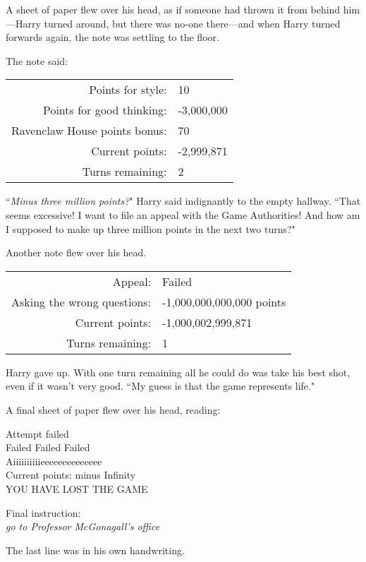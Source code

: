 A sheet of paper flew over his head, as if someone had thrown it from behind him—Harry turned around, but there was no-one there—and when Harry turned forwards again, the note was settling to the floor.

The note said:
\begin{writtenNote}
\begin{tabular}{rl}
Points for style: & 10\\
Points for good thinking: & -3,000,000\\
Ravenclaw House points bonus: & 70\\
Current points: & -2,999,871\\
Turns remaining: & 2
\end{tabular}
\end{writtenNote}

``\emph{Minus three million points?}" Harry said indignantly to the empty hallway. ``That seems excessive! I want to file an appeal with the Game Authorities! And how am I supposed to make up three million points in the next two turns?"

Another note flew over his head.
\begin{writtenNote}
\begin{tabular}{rl}
Appeal: & Failed\\
Asking the wrong questions: & -1,000,000,000,000 points\\
Current points: & -1,000,002,999,871\\
Turns remaining: & 1
\end{tabular}
\end{writtenNote}

Harry gave up. With one turn remaining all he could do was take his best shot, even if it wasn't very good. ``My guess is that the game represents life."

A final sheet of paper flew over his head, reading:

\begin{writtenNote}
Attempt failed\\
Failed Failed Failed\\
Aiiiiiiiiiieeeeeeeeeeeeee\\
Current points: minus Infinity\\
\MakeUppercase{You have lost the game}

Final instruction:\\
\emph{go to Professor McGonagall's office}
\end{writtenNote}

The last line was in his own handwriting.

